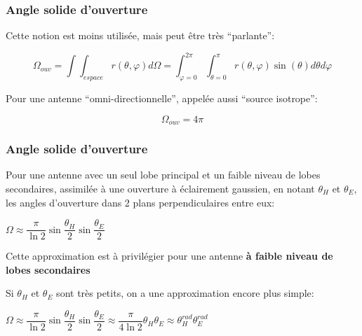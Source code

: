 \documentclass[
10pt,
aspectratio=169,
]{beamer}
\begin{document}
\begin{frame}
\frametitle{Angle solide d'ouverture}
Cette notion est moins utilisée, mais peut être très ``parlante'':

\[\Omega_{ouv}=\int\int_{espace}r(\theta,\varphi) d\Omega=\int_{\varphi=0}^{2\pi}\int_{\theta=0}^\pi r(\theta,\varphi)\sin(\theta)d\theta d\varphi\]

\vspace{1cm}
Pour une antenne ``omni-directionnelle'', appelée aussi ``source isotrope'':

\[\Omega_{ouv}=4\pi\]

\end{frame}

\begin{frame}
\frametitle{Angle solide d'ouverture}

Pour une antenne avec un seul lobe principal et un faible niveau de lobes secondaires, 
assimilée à une ouverture à éclairement gaussien, en notant $\theta_H$ et 
$\theta_E$, les angles d'ouverture dans 2 plans perpendiculaires entre eux:

\vspace{0.5cm}
\begin{tcolorbox}[colframe=red,width=5cm]
\center$\Omega\approx\dfrac{\pi}{\ln 2}\sin\dfrac{\theta_H}{2}\sin\dfrac{\theta_E}{2}$
\end{tcolorbox}

\vspace{0.5cm}
Cette approximation est à privilégier pour une antenne \textbf{à faible
niveau de lobes secondaires}

\vspace{0.5cm}
Si $\theta_H$ et $\theta_E$ sont très petits, on a une approximation encore plus simple:

\begin{tcolorbox}[colframe=red,width=9cm]
    \center$\Omega\approx\dfrac{\pi}{\ln 2}\sin\dfrac{\theta_H}{2}\sin\dfrac{\theta_E}{2}\approx\dfrac{\pi}{4\ln 2}\theta_H\theta_E\approx\theta_H^{rad}\theta_E^{rad}$
    \end{tcolorbox}

\end{frame}

\end{document}
